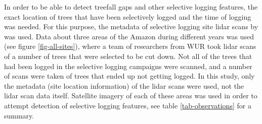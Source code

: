 \documentclass[a4paper,12pt]{scrbook}
\begin{document}
\begin{table}
  \caption{Summary of satellite imagery used for each study site. Observations are the total number of images processed for the study site, stable history indicates whether there were enough observations before the logging event to allow for analysis based on time series.}
  \label{tab-observations}
\end{table}


In order to be able to detect treefall gaps and other selective logging features, the exact location of trees that have been selectively logged and the time of logging was needed. For this purpose, the metadata of selective logging site lidar scans by \citet{gonzalez_de_tanago_menaca_estimation_2017} was used. Data about three areas of the Amazon during different years was used (see figure \ref{fig-all-sites}), where a team of researchers from \ac{WUR} took lidar scans of a number of trees that were selected to be cut down. Not all of the trees that had been logged in the selective logging campaigns were scanned, and a number of scans were taken of trees that ended up not getting logged. In this study, only the metadata (site location information) of the lidar scans were used, not the lidar scan data itself. Satellite imagery of each of these areas was used in order to attempt detection of selective logging features, see table \ref{tab-observations} for a summary.
\end{document}
